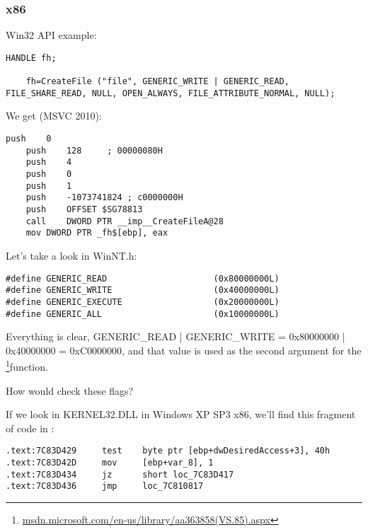 \subsubsection{x86}

Win32 API example:

\begin{lstlisting}[style=customc]
	HANDLE fh;

	fh=CreateFile ("file", GENERIC_WRITE | GENERIC_READ, FILE_SHARE_READ, NULL, OPEN_ALWAYS, FILE_ATTRIBUTE_NORMAL, NULL);
\end{lstlisting}

We get (MSVC 2010):

\begin{lstlisting}[caption=MSVC 2010,style=customasmx86]
	push	0
	push	128		; 00000080H
	push	4
	push	0
	push	1
	push	-1073741824	; c0000000H
	push	OFFSET $SG78813
	call	DWORD PTR __imp__CreateFileA@28
	mov	DWORD PTR _fh$[ebp], eax
\end{lstlisting}

Let's take a look in WinNT.h:

\begin{lstlisting}[caption=WinNT.h,style=customc]
#define GENERIC_READ                     (0x80000000L)
#define GENERIC_WRITE                    (0x40000000L)
#define GENERIC_EXECUTE                  (0x20000000L)
#define GENERIC_ALL                      (0x10000000L)
\end{lstlisting}

Everything is clear,
GENERIC\_READ | GENERIC\_WRITE = 0x80000000 | 0x40000000 = 0xC0000000,
and that value is used as the second argument for the \footnote{\href{http://msdn.microsoft.com/en-us/library/aa363858(VS.85).aspx}{msdn.microsoft.com/en-us/library/aa363858(VS.85).aspx}}function.

How would  check these flags?

If we look in KERNEL32.DLL in Windows XP SP3 x86, we'll find this fragment of code in :

\begin{lstlisting}[caption=KERNEL32.DLL (Windows XP SP3 x86),style=customasmx86]
.text:7C83D429     test    byte ptr [ebp+dwDesiredAccess+3], 40h
.text:7C83D42D     mov     [ebp+var_8], 1
.text:7C83D434     jz      short loc_7C83D417
.text:7C83D436     jmp     loc_7C810817
\end{lstlisting}


